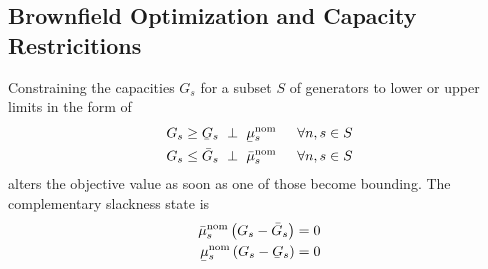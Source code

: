 \documentclass[11pt,twocolumn]{article}
\newcommand{\ubar}[1]{\underaccent{\bar}{#1}}
\newcommand{\hpad}{\hspace{15pt}}
\newcommand{\resultsin}[1]{\hspace{6pt} \bot  \hspace{6pt} #1}
\newcommand{\capacityGeneration}{G_{s}}
\newcommand{\capacityGenerationUpper}{\bar{G}_{s}}
\newcommand{\capacityGenerationLower}{\ubar{G}_{s}}
\newcommand{\capacityFlow}{F_{\ell}}
\newcommand{\capacityFlowUpper}{\bar{F}_{\ell}}
\newcommand{\capacityFlowLower}{\ubar{F}_{\ell}}
\newcommand{\muuppergenerationnom}{\bar{\mu}^\text{nom}_{s}}
\newcommand{\mulowergenerationnom}{\ubar{\mu}^\text{nom}_{s}}
\newcommand{\muupperflownom}{\bar{\mu}^\text{nom}_{\ell}}
\newcommand{\mulowerflownom}{\ubar{\mu}^\text{nom}_{\ell}}
\begin{document}
\subsection{Brownfield Optimization and Capacity Restricitions}

Constraining the capacities $\capacityGeneration$  for a subset $S$ of generators to lower or upper limits in the form of
\begin{align}
\capacityGeneration \ge \capacityGenerationLower \resultsin{\mulowergenerationnom} \hpad \forall{n,s \in S} \\
\capacityGeneration \le \capacityGenerationUpper \resultsin{\muuppergenerationnom} \hpad \forall{n,s \in S}
\end{align}
alters the objective value as soon as one of those become bounding. 
The complementary slackness state is 
\begin{align}
 \muuppergenerationnom \left( \capacityGeneration - \capacityGenerationUpper \right) =0 \\
 \mulowergenerationnom \left( \capacityGeneration - \capacityGenerationLower \right) =0 \\
\end{align}
\end{document}
